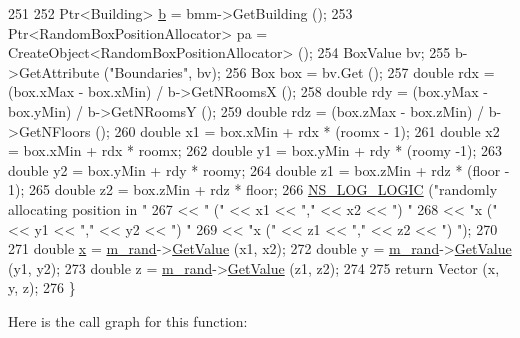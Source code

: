 \begin{DoxyCode}
251 
252   Ptr<Building> \hyperlink{buildings__pathloss_8m_a21ad0bd836b90d08f4cf640b4c298e7c}{b} = bmm->GetBuilding ();
253   Ptr<RandomBoxPositionAllocator> pa = CreateObject<RandomBoxPositionAllocator> ();
254   BoxValue bv;
255   b->GetAttribute (\textcolor{stringliteral}{"Boundaries"}, bv);
256   Box box = bv.Get ();
257   \textcolor{keywordtype}{double} rdx =  (box.xMax - box.xMin) / b->GetNRoomsX ();
258   \textcolor{keywordtype}{double} rdy =  (box.yMax - box.yMin) / b->GetNRoomsY ();
259   \textcolor{keywordtype}{double} rdz =  (box.zMax - box.zMin) / b->GetNFloors ();
260   \textcolor{keywordtype}{double} x1 = box.xMin + rdx * (roomx - 1);
261   \textcolor{keywordtype}{double} x2 = box.xMin + rdx * roomx;
262   \textcolor{keywordtype}{double} y1 = box.yMin + rdy * (roomy -1);
263   \textcolor{keywordtype}{double} y2 = box.yMin + rdy * roomy;
264   \textcolor{keywordtype}{double} z1 = box.zMin + rdz * (floor - 1);
265   \textcolor{keywordtype}{double} z2 = box.zMin + rdz * floor;
266   \hyperlink{group__logging_ga88acd260151caf2db9c0fc84997f45ce}{NS\_LOG\_LOGIC} (\textcolor{stringliteral}{"randomly allocating position in "}
267                 << \textcolor{stringliteral}{" ("} << x1 << \textcolor{stringliteral}{","} << x2 << \textcolor{stringliteral}{") "}
268                 << \textcolor{stringliteral}{"x ("} << y1 << \textcolor{stringliteral}{","} << y2 << \textcolor{stringliteral}{") "}
269                 << \textcolor{stringliteral}{"x ("} << z1 << \textcolor{stringliteral}{","} << z2 << \textcolor{stringliteral}{") "});
270 
271   \textcolor{keywordtype}{double} \hyperlink{lte__link__budget__x2__handover__measures_8m_a9336ebf25087d91c818ee6e9ec29f8c1}{x} = \hyperlink{classns3_1_1SameRoomPositionAllocator_a4aba0af39b8d1e6218271bc5d09b4ba2}{m\_rand}->\hyperlink{classns3_1_1UniformRandomVariable_a03822d8c86ac51e9aa83bbc73041386b}{GetValue} (x1, x2);
272   \textcolor{keywordtype}{double} y = \hyperlink{classns3_1_1SameRoomPositionAllocator_a4aba0af39b8d1e6218271bc5d09b4ba2}{m\_rand}->\hyperlink{classns3_1_1UniformRandomVariable_a03822d8c86ac51e9aa83bbc73041386b}{GetValue} (y1, y2);
273   \textcolor{keywordtype}{double} z = \hyperlink{classns3_1_1SameRoomPositionAllocator_a4aba0af39b8d1e6218271bc5d09b4ba2}{m\_rand}->\hyperlink{classns3_1_1UniformRandomVariable_a03822d8c86ac51e9aa83bbc73041386b}{GetValue} (z1, z2);
274 
275   \textcolor{keywordflow}{return} Vector (x, y, z);
276 \}
\end{DoxyCode}


Here is the call graph for this function\+:


